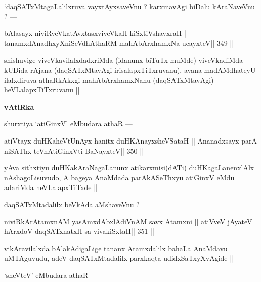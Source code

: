 \begin{artha}
`daqSATxMtagaLalilxruva vayxtAyxsaveVnu ? karxmavAgi biDalu kAraNaveVnu ? ---
\end{artha}

\begin{shl}
bAlasayx niviRveVkatAvxtasxviveVkaH kiSxtiVshavxraH ||
tanamxdAnadhxyXniSeVdhAthaRM mahAbArxhamxNa ucayxteV\hfill || 349 ||
\end{shl}

\begin{artha}
shishuvige viveVkavilalxdadxriMda (idanunx biTuTx muMde) viveVkadiMda kUDida rAjana (daqSATxMtavAgi irisalapxTiTxruvanu), avana madAMdhateyU ilalxdiruva athaRkAkxgi mahAbArxhamxNanu (daqSATxMtavAgi) heVLalapxTiTxruvanu ||
\end{artha}

\begin{center}
{\large\bf vAtiRka}
\end{center}

\begin{artha}
shurxtiya `atiGinxV' eMbudara athaR ---
\end{artha}

\begin{shl}
atiVtayx duHKaheVtUnAyx hanitx duHKAnayxsheVSataH ||
Ananadxsayx parA niSAThx teVnAtiGinxVti BaNayxteV\hfill || 350 ||
\end{shl}

\begin{artha}
yAva sithxtiyu duHKakAraNagaLanunx atikarxmisi(dATi) duHKagaLanenxlAlx nAshagoLisuvudo, A bageya AnaMdada parAkASeThxyu atiGinxV eMdu adariMda heVLalapxTiTxde ||
\end{artha}

\begin{artha}
daqSATxMtadalilx beVkAda aMshaveVnu ?
\end{artha}

\begin{shl}
niviRkArAtamxnAM yasAmxdAbxlAdiVnAM savx Atamxni ||
atiVveV jAyateV hArxdoV daqSATxnatxH sa vivakiSxtaH\hfill || 351 ||
\end{shl}

\begin{artha}
vikAravilalxda bAlakAdigaLige tananx Atamxdalilx bahaLa AnaMdavu uMTAguvudu, adeV daqSATxMtadalilx parxkaqta udidxSaTxyXvAgide ||
\end{artha}

\begin{artha}
`sheVteV' eMbudara athaR
\end{artha}

